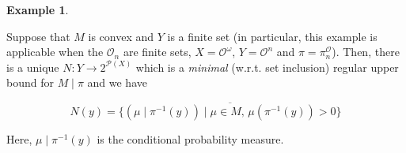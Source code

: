 \documentclass[aop,preprint]{imsart}
\numberwithin{equation}{section}
\theoremstyle{definition}
\newtheorem{example}{Example}[section]
\theoremstyle{plain}
\newcommand{\Comment}[1]{}
\newcommand{\Nats}{\mathbb{N}}
\newcommand{\PM}{\mathcal{P}}
\newcommand{\Ob}{\mathcal{O}}
\newcommand{\OO}{\Ob^\omega}
\newcommand{\PO}{\pi^\Ob}
\newcommand{\PMO}{\PM(\OO)}
\begin{document}
\begin{samepage}
\begin{example}
\label{exm:update_incomplete_finite}

Suppose that $M$ is convex and $Y$ is a finite set (in particular, this example is applicable when the $\Ob_n$ are finite sets, $X=\OO$, $Y=\Ob^n$ and $\pi=\PO_n$). Then, there is a unique $N: Y \rightarrow 2^{\PM(X)}$ which is a \emph{minimal} (w.r.t. set inclusion) regular upper bound for $M \mid \pi$ and we have

\begin{equation}
\label{eqn:exm__update_incomplete_finite}
N(y) = \overline{\{\left(\mu \mid \pi^{-1}(y)\right) \mid \mu \in M,\, \mu\left(\pi^{-1}(y)\right) > 0\}}
\end{equation}

Here, $\mu \mid \pi^{-1}(y)$ is the conditional probability measure.

\end{example}
\end{samepage}
%
\Comment{\begin{samepage}
\begin{example}

Suppose that $M$ is convex, for each $n \in \Nats$, $\Ob_n = [0,1]$ and for each $\nu \in M$ and $n \in \Nats$, $\PO_{n*}\nu$ is absolutely continuous w.r.t. the Lebesgue measure on $\Ob^n=[0,1]^n$ and its PDF (Radon-Nikodym derivative) is continuous and positive everywhere. Then, $M \mid \Ob^n$ is the closure of the set of all $(y,\mu) \in \Ob^n \times \PMO$ for which there exists $\nu \in M$ s.t. for any $m \geq n$ and $A \subseteq [0,1]^{m-n}$ measurable

\begin{equation}
\mu\left(\left(\PO_m\right)^{-1}(y \times A)\right)=\frac{\int_A \frac{d\PO_{m*}\nu(z)}{dz}\prod_{k=n}^{m-1} dz_k}{\int_{[0,1]^{m-n}} \frac{d\PO_{m*}\nu(z)}{dz}\prod_{k=n}^{m-1} dz_k}
\end{equation}

\end{example}
\end{samepage}}
%
\end{document}

